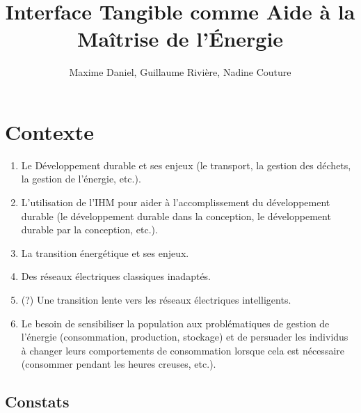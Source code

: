 \documentclass[10pt,a5paper,twoside]{article}
\title{Interface Tangible comme Aide à la Maîtrise de l'Énergie}
\author{Maxime Daniel, Guillaume Rivière, Nadine Couture}
\begin{document}
\maketitle
{}

\section{Contexte}\label{contexte}

\begin{enumerate}
\def\labelenumi{\arabic{enumi}.}
\itemsep1pt\parskip0pt
\item
  Le Développement durable et ses enjeux (le transport, la gestion des
  déchets, la gestion de l'énergie, etc.).
\item
  L'utilisation de l'IHM pour aider à l'accomplissement du développement
  durable (le développement durable dans la conception, le développement
  durable par la conception, etc.).
\item
  La transition énergétique et ses enjeux.
\item
  Des réseaux électriques classiques inadaptés.
\item
  (?) Une transition lente vers les réseaux électriques intelligents.
\item
  Le besoin de sensibiliser la population aux problématiques de gestion
  de l'énergie (consommation, production, stockage) et de persuader les
  individus à changer leurs comportements de consommation lorsque cela
  est nécessaire (consommer pendant les heures creuses, etc.).
\end{enumerate}

\subsection{Constats}\label{constats}
\end{document}
